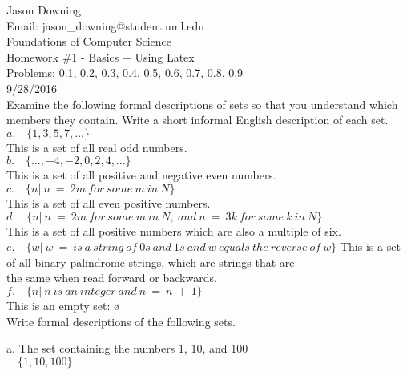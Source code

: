 \documentclass[12pt]{article}
\begin{document}
\noindent
Jason Downing \\
Email: jason\_downing@student.uml.edu \\
Foundations of Computer Science \\
Homework \#1 - Basics + Using Latex \\
Problems: 0.1, 0.2, 0.3, 0.4, 0.5, 0.6, 0.7, 0.8, 0.9 \\
9/28/2016 \\

 \quad Examine the following formal descriptions of sets so that you understand which
members they contain. Write a short informal English description of each set.
\\
\indent
$a. \quad \{1, 3, 5, 7, ...\} $ \\
\indent
This is a set of all real odd numbers. \\

$b. \quad \{...,-4,-2,0,2,4,...\} $ \\
\indent
This is a set of all positive and negative even numbers. \\

$c. \quad \{n |\ n \ = \ 2m \ for \ some \ m \ in \ N\} $ \\
\indent
This is a set of all even positive numbers. \\

$d. \quad \{n |\ n \ = \ 2m \ for \ some \ m \ in \ N, \
and \ n \ = \ 3k \ for \ some \ k \ in \ N\} $ \\
\indent
This is a set of all positive numbers which are also a multiple of six. \\

$e. \quad \{w |\ w \ = \ is \ a \ string \ of \ 0s \
and \ 1s \ and \ w \ equals \ the \ reverse \ of \ w \} $
\indent
This is a set of all binary palindrome strings, which are strings that are \\
\indent
the same when read forward or backwards. \\

$f. \quad \{n |\ n \ is \ an \ integer \ and \ n \ = \ n \ + \ 1 \} $ \\
\indent
This is an empty set: \o \\

 \quad Write formal descriptions of the following sets.

a. The set containing the numbers 1, 10, and 100 \\
\indent
$ \quad \{1, 10, 100\} $ \\
\end{document}
